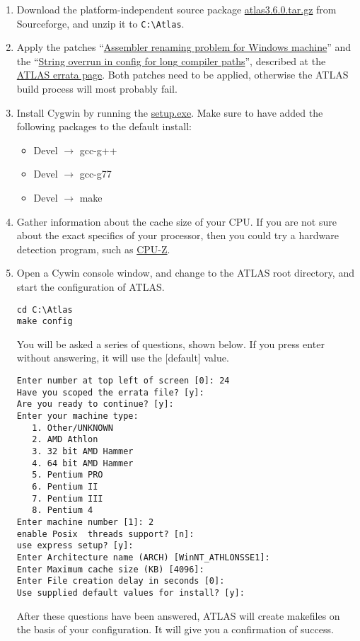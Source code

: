 \documentclass{article}
\begin{document}
\begin{enumerate}
\item Download the platform-independent source package
\href{http://prdownloads.sourceforge.net/math-atlas/atlas3.6.0.tar.gz?download}{atlas3.6.0.tar.gz}
from Sourceforge, and unzip it to \texttt{C:\textbackslash Atlas}.

\item Apply the patches ``\href{http://math-atlas.sourceforge.net/errata.html#winsse}
{Assembler renaming problem for Windows machine}'' and the 
``\href{http://math-atlas.sourceforge.net/errata.html#longcomp}{String overrun in config for long compiler paths}'',
described at the 
\href{http://math-atlas.sourceforge.net/errata.html}
{ATLAS errata page}. Both patches need to be applied, otherwise the
ATLAS build process will most probably fail.

\item Install Cygwin by running the 
\href{http://www.cygwin.com/setup.exe}{setup.exe}. Make sure to have added the
following packages to the default install:
\begin{itemize}
\item Devel $\rightarrow$ gcc-g++
\item Devel $\rightarrow$ gcc-g77
\item Devel $\rightarrow$ make
\end{itemize}

\item Gather information about the cache size of your CPU.
If you are not sure about the exact specifics of your processor, then
you could try a hardware detection program, such as 
\href{http://www.cpuid.org/cpuz.php}{CPU-Z}.

\item Open a Cywin console window, and change to the ATLAS root
directory, and start the configuration of ATLAS.
%
\begin{verbatim}
cd C:\Atlas
make config
\end{verbatim}
%
You will be asked a series of questions, shown below. If you press enter 
without answering, it will use the [default] value. 
%
\begin{verbatim}
Enter number at top left of screen [0]: 24
Have you scoped the errata file? [y]:
Are you ready to continue? [y]:
Enter your machine type:
   1. Other/UNKNOWN
   2. AMD Athlon
   3. 32 bit AMD Hammer
   4. 64 bit AMD Hammer
   5. Pentium PRO
   6. Pentium II
   7. Pentium III
   8. Pentium 4
Enter machine number [1]: 2
enable Posix  threads support? [n]: 
use express setup? [y]:
Enter Architecture name (ARCH) [WinNT_ATHLONSSE1]:
Enter Maximum cache size (KB) [4096]:
Enter File creation delay in seconds [0]:
Use supplied default values for install? [y]:
\end{verbatim}
%
After these questions have been answered, ATLAS will create makefiles on the basis of your
configuration. It will give you a confirmation of success. 


\end{enumerate}
\end{document}
